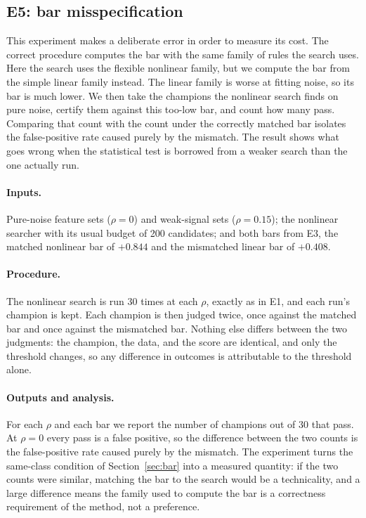 \documentclass[11pt]{article}
\begin{document}
\subsection{E5: bar misspecification}

This experiment makes a deliberate error in order to measure its
cost. The correct procedure computes the bar with the same family of rules the search uses. Here the
search uses the flexible nonlinear family, but we compute the bar from the simple linear family instead.
The linear family is worse at fitting noise, so its bar is much lower. We then take the champions the
nonlinear search finds on pure noise, certify them against this too-low bar, and count how many pass.
Comparing that count with the count under the correctly matched bar isolates the false-positive rate
caused purely by the mismatch. The result shows what goes wrong when the statistical test is borrowed
from a weaker search than the one actually run.

\paragraph{Inputs.} Pure-noise feature sets ($\rho=0$) and weak-signal sets ($\rho=0.15$); the nonlinear
searcher with its usual budget of 200 candidates; and both bars from E3, the matched nonlinear bar of
$+0.844$ and the mismatched linear bar of $+0.408$.

\paragraph{Procedure.} The nonlinear search is run 30 times at each $\rho$, exactly as in E1, and each
run's champion is kept. Each champion is then judged twice, once against the matched bar and once against
the mismatched bar. Nothing else differs between the two judgments: the champion, the data, and the score
are identical, and only the threshold changes, so any difference in outcomes is attributable to the
threshold alone.

\paragraph{Outputs and analysis.} For each $\rho$ and each bar we report the number of champions out of
30 that pass. At $\rho=0$ every pass is a false positive, so the difference between the two counts is the
false-positive rate caused purely by the mismatch. The experiment turns the same-class condition of
Section~\ref{sec:bar} into a measured quantity: if the two counts were similar, matching the bar to the
search would be a technicality, and a large difference means the family used to compute the bar is a
correctness requirement of the method, not a preference.
\end{document}
